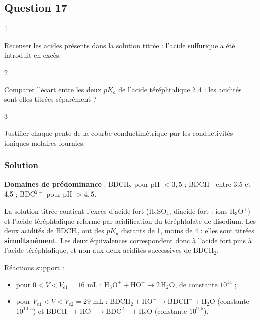 \documentclass[11pt,a4paper]{article}
\providecommand{\tightlist}{\setlength{\itemsep}{0pt}\setlength{\parskip}{0pt}}
\begin{document}
\hypertarget{question-17}{%
\subsection{Question 17}\label{question-17}}

\begin{indication}{1}

Recenser les acides présents dans la solution titrée : l'acide sulfurique a été introduit en excès.

\end{indication}

\begin{indication}{2}

Comparer l'écart entre les deux \(pK_a\) de l'acide téréphtalique à 4 : les acidités sont-elles titrées séparément ?

\end{indication}

\begin{indication}{3}

Justifier chaque pente de la courbe conductimétrique par les conductivités ioniques molaires fournies.

\end{indication}

\hypertarget{solution-16}{%
\subsubsection{Solution}\label{solution-16}}

\textbf{Domaines de prédominance} : \(\mathrm{BDCH_2}\) pour pH \(<3{,}5\) ; \(\mathrm{BDCH^-}\) entre 3,5 et 4,5 ; \(\mathrm{BDC^{2-}}\) pour pH \(>4{,}5\).

La solution titrée contient l'excès d'acide fort (\(\mathrm{H_2SO_4}\), diacide fort : ions \(\mathrm{H_3O^+}\)) et l'acide téréphtalique reformé par acidification du téréphtalate de disodium. Les deux acidités de \(\mathrm{BDCH_2}\) ont des \(pK_a\) distants de 1, moins de 4 : elles sont titrées \textbf{simultanément}. Les deux équivalences correspondent donc à l'acide fort puis à l'acide téréphtalique, et non aux deux acidités successives de \(\mathrm{BDCH_2}\).

Réactions support :

\begin{itemize}
\tightlist
\item
  pour \(0<V<V_{e1}=16\) mL : \(\mathrm{H_3O^+}+\mathrm{HO^-}\to2\,\mathrm{H_2O}\), de constante \(10^{14}\) ;
\item
  pour \(V_{e1}<V<V_{e2}=29\) mL : \(\mathrm{BDCH_2}+\mathrm{HO^-}\to\mathrm{BDCH^-}+\mathrm{H_2O}\) (constante \(10^{10{,}5}\)) et \(\mathrm{BDCH^-}+\mathrm{HO^-}\to\mathrm{BDC^{2-}}+\mathrm{H_2O}\) (constante \(10^{9{,}5}\)).
\end{itemize}
\end{document}
